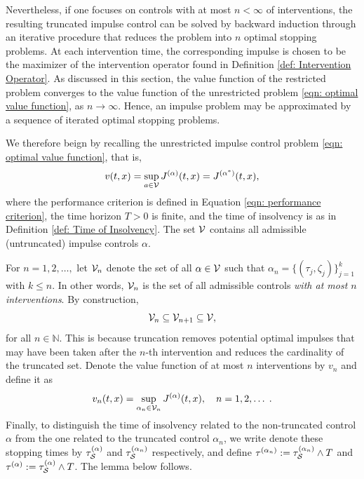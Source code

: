 Nevertheless, if one focuses on controls with at most $n<\infty$ of interventions, the resulting truncated impulse control can be solved by backward induction through an iterative procedure that reduces the problem into $n$ optimal stopping problems. At each intervention time, the corresponding impulse is chosen to be the maximizer of the intervention operator found in Definition \ref{def: Intervention Operator}. As discussed in this section, the value function of the restricted problem converges to the value function of the unrestricted problem \eqref{eqn: optimal value function}, as $n \rightarrow \infty$. Hence, an impulse problem may be approximated by a sequence of iterated optimal stopping problems. 

We therefore beign by recalling the unrestricted impulse control problem \eqref{eqn: optimal value function}, that is,
\begin{equation*}
    v(t,x) = \sup_{a \in \mathcal{V}}J^{(\alpha)}(t,x) = J^{(\alpha^*)}(t,x),
\end{equation*}
where the performance criterion is defined in Equation \eqref{eqn: performance criterion}, the time horizon $T>0$ is finite, and the time of insolvency is as in Definition \ref{def: Time of Insolvency}.  The set $\mathcal{V}$ contains all admissible (untruncated) impulse controls $\alpha$.

For $n=1, 2, \ldots,$ let $\mathcal{V}_n$ denote the set of all $\alpha \in \mathcal{V}$ such that $\alpha_n = \{(\tau_j, \zeta_j)\}_{j=1}^k$ with $k \leq n$. In other words, $\mathcal{V}_n$ is the set of all admissible controls \emph{with at most $n$ interventions}. By construction,
\begin{equation*}
    \mathcal{V}_n  \subseteq \mathcal{V}_{n+1} \subseteq \mathcal{V},
\end{equation*}
for all $n \in \mathbb N$. This is because truncation removes potential optimal impulses that may have been taken after the $n$-th intervention and reduces the cardinality of the truncated set. Denote the value function of at most $n$ interventions by $v_n$ and define it as
\begin{equation}
    v_n(t,x) = \sup_{\alpha_n \in \mathcal{V}_n} J^{(\alpha)}(t,x), \quad n=1,2, \ldots \;.
    \label{eqn: value function for at most n interventions}
\end{equation}
Finally, to distinguish the time of insolvency related to the non-truncated control $\alpha$ from the one related to the truncated control $\alpha_n$, we write denote these stopping times by $\tau_{\mathcal{S}}^{(\alpha)}$ and $\tau_{\mathcal{S}}^{(\alpha_n)}$ respectively, and define $\tau^{(\alpha_n)} := \tau_{\mathcal{S}}^{(\alpha_n)}\wedge T$ and $\tau^{(\alpha)} := \tau_{\mathcal{S}}^{(\alpha)} \wedge T$. The lemma below follows.

